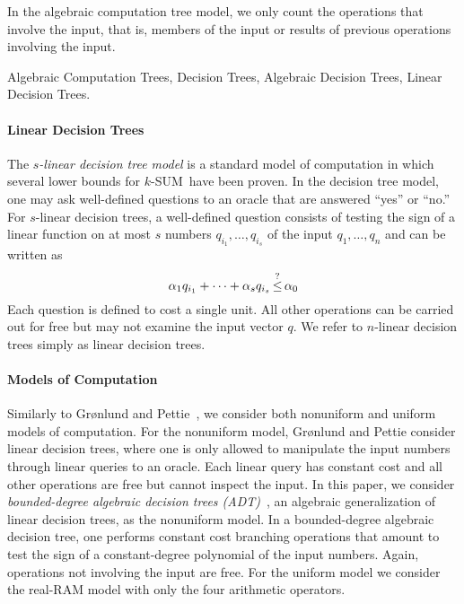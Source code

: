 In the algebraic computation tree model, we only count the operations that
involve the input, that is, members of the input or results of previous
operations involving the input.

Algebraic Computation Trees,
Decision Trees,
Algebraic Decision Trees,
Linear Decision Trees.

\paragraph{Linear Decision Trees}

The \emph{\(s\)-linear decision tree model} is a standard model of computation
in which several lower bounds for \(k\)-SUM\ have been proven. In the decision tree
model, one may ask well-defined questions to an oracle that are answered
``yes'' or ``no.'' For $s$-linear decision trees, a well-defined question consists
of testing the sign of a linear function on at most \(s\) numbers \(q_{i_1},\ldots,q_{i_s}\) of the
input \(q_1,\ldots,q_n\) and can be written as
%
\begin{displaymath}
	\alpha_1 q_{i_1} + \cdots + \alpha_s q_{i_s} \mathop{\le}^{?} \alpha_0
\end{displaymath}
%
Each question is defined to cost a single unit. All other operations can be
carried out for free but may not examine the input vector $q$. We refer to
$n$-linear decision trees simply as linear decision trees.

\paragraph{Models of Computation}

Similarly to Gr\o nlund and Pettie~\cite{GP18}, we consider both nonuniform
and uniform models of computation.
%
For the nonuniform model, Gr\o nlund and Pettie consider linear
decision trees, where one is only allowed to manipulate the input numbers
through linear queries to an oracle. Each linear query has constant cost and
all other operations are free but cannot inspect the input.
%
In this paper, we consider
\emph{bounded-degree algebraic decision trees (ADT)}~\cite{R72,Y81,SY82},
an algebraic generalization of linear decision trees,
as the nonuniform model. In a bounded-degree algebraic decision tree, one
performs constant cost branching operations that amount to test the sign of
a constant-degree polynomial of the input numbers. Again,
operations not involving the input are free.
%
For the uniform model we consider the real-RAM model with only the four
arithmetic operators.
